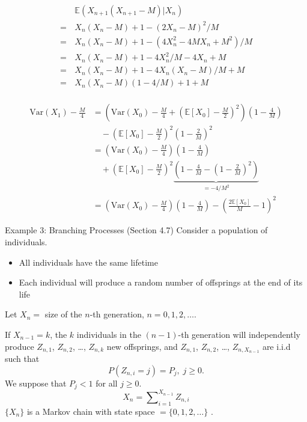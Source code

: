 \documentclass[letterpaper]{beamer}
\def\Sum{\sum\nolimits}
\def\E{\mathbb E}
\def\V{\mathrm{Var}}
\begin{document}
\begin{frame}

\begin{align*}
&\E(X_{n+1}(X_{n+1}-M)|X_n)\\
=\,&X_n(X_n-M)+1-(2X_n-M)^2/M\\
=\,&X_n(X_n-M)+1-(4X_n^2-4MX_n+M^2)/M\\
=\,&X_n(X_n-M)+1-4X_n^2/M-4X_n+M\\
=\,&X_n(X_n-M)+1-4X_n(X_n-M)/M+M\\
=\,&X_n(X_n-M)(1-4/M)+1+M\\
\end{align*}


\end{frame}
\begin{frame}
\begin{align*}
\V(X_1)-\frac{M}{4}&=\left(\V(X_0)-\frac{M}{4}+\left(\E[X_{0}]-\frac{M}{2}\right)^2\right)\left(1-\frac{4}{M}\right)\\
&\quad-\left(\E[X_{0}]-\frac{M}{2}\right)^2\left(1-\frac{2}{M}\right)^{2}\\
&=\left(\V(X_0)-\frac{M}{4}\right)\left(1-\frac{4}{M}\right)\\
&\quad+\left(\E[X_{0}]-\frac{M}{2}\right)^2\underbrace{\left(1-\frac{4}{M}-\left(1-\frac{2}{M}\right)^{2}\right)}_{=-4/M^2}\\
&=\left(\V(X_0)-\frac{M}{4}\right)\left(1-\frac{4}{M}\right)-\left(\frac{2\E[X_{0}]}{M}-1\right)^2
\end{align*}

\end{frame}
\begin{frame}{Example 3: Branching Processes (Section 4.7)}
Consider a population of individuals.
\begin{itemize}
\item All individuals have the same lifetime
\item Each individual will produce a random number of offsprings at the end of its life
\end{itemize}
Let $X_n=$ size of the $n$-th generation, $n=0,1,2,\ldots$.

If $X_{n-1}=k$, the $k$ individuals in the $(n-1)$-th generation will independently produce $Z_{n,1}$, $Z_{n,2}$, \ldots, $Z_{n,k}$ new offsprings, and $Z_{n,1}$, $Z_{n,2}$, \ldots, $Z_{n,X_{n-1}}$ are i.i.d such that
$$P(Z_{n,i}=j)=P_j,\; j \ge 0.$$
We suppose that $P_j < 1$ for all $j \ge 0$.
\begin{equation}\label{eq:branching}
X_{n} =\Sum_{i=1}^{X_{n-1}}Z_{n,i}
\end{equation}
$\{X_n\}$ is a Markov chain with state space $=\{0,1,2,\ldots\}$ .
\end{frame}
\end{document}
